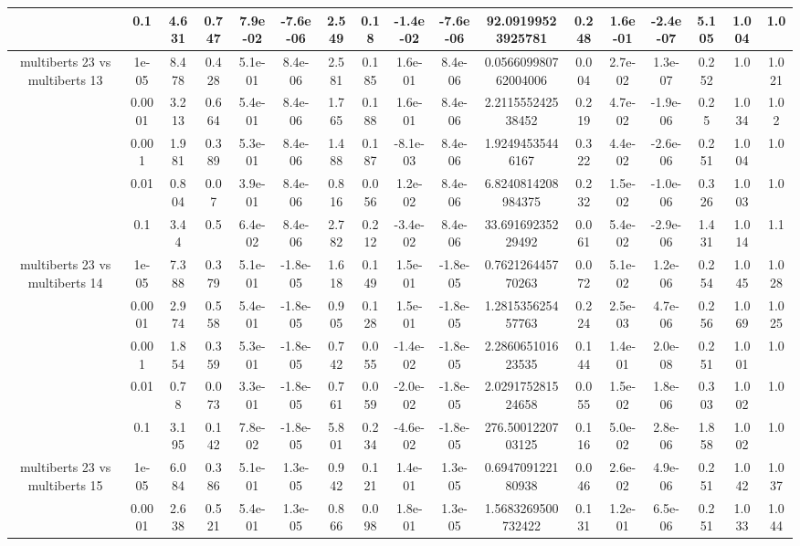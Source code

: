 \begin{tabular}{|c|c|c|c|c|c|c|c|c|c|c|c|c|c|c|c|c|}
 & 0.1 & 4.631 & 0.747 & 7.9e-02 & -7.6e-06 & 2.549 & 0.18 & -1.4e-02 & -7.6e-06 & 92.09199523925781 & 0.248 & 1.6e-01 & -2.4e-07 & 5.105 & 1.004 & 1.0 \\
\hline
\multirow{5}{*}{multiberts 23 vs multiberts 13} & 1e-05 & 8.478 & 0.428 & 5.1e-01 & 8.4e-06 & 2.581 & 0.185 & 1.6e-01 & 8.4e-06 & 0.056609980762004006 & 0.004 & 2.7e-02 & 1.3e-07 & 0.252 & 1.0 & 1.021 \\
 & 0.0001 & 3.213 & 0.664 & 5.4e-01 & 8.4e-06 & 1.765 & 0.188 & 1.6e-01 & 8.4e-06 & 2.211555242538452 & 0.219 & 4.7e-02 & -1.9e-06 & 0.25 & 1.034 & 1.02 \\
 & 0.001 & 1.981 & 0.389 & 5.3e-01 & 8.4e-06 & 1.488 & 0.187 & -8.1e-03 & 8.4e-06 & 1.92494535446167 & 0.322 & 4.4e-02 & -2.6e-06 & 0.251 & 1.004 & 1.0 \\
 & 0.01 & 0.804 & 0.07 & 3.9e-01 & 8.4e-06 & 0.816 & 0.056 & 1.2e-02 & 8.4e-06 & 6.8240814208984375 & 0.232 & 1.5e-02 & -1.0e-06 & 0.326 & 1.003 & 1.0 \\
 & 0.1 & 3.44 & 0.5 & 6.4e-02 & 8.4e-06 & 2.782 & 0.212 & -3.4e-02 & 8.4e-06 & 33.69169235229492 & 0.061 & 5.4e-02 & -2.9e-06 & 1.431 & 1.014 & 1.1 \\
\hline
\multirow{5}{*}{multiberts 23 vs multiberts 14} & 1e-05 & 7.388 & 0.379 & 5.1e-01 & -1.8e-05 & 1.618 & 0.149 & 1.5e-01 & -1.8e-05 & 0.762126445770263 & 0.072 & 5.1e-02 & 1.2e-06 & 0.254 & 1.045 & 1.028 \\
 & 0.0001 & 2.974 & 0.558 & 5.4e-01 & -1.8e-05 & 0.905 & 0.128 & 1.5e-01 & -1.8e-05 & 1.281535625457763 & 0.224 & 2.5e-03 & 4.7e-06 & 0.256 & 1.069 & 1.025 \\
 & 0.001 & 1.854 & 0.359 & 5.3e-01 & -1.8e-05 & 0.742 & 0.055 & -1.4e-02 & -1.8e-05 & 2.286065101623535 & 0.144 & 1.4e-01 & 2.0e-08 & 0.251 & 1.001 & 1.0 \\
 & 0.01 & 0.78 & 0.073 & 3.3e-01 & -1.8e-05 & 0.761 & 0.059 & -2.0e-02 & -1.8e-05 & 2.029175281524658 & 0.055 & 1.5e-02 & 1.8e-06 & 0.303 & 1.002 & 1.0 \\
 & 0.1 & 3.195 & 0.142 & 7.8e-02 & -1.8e-05 & 5.801 & 0.234 & -4.6e-02 & -1.8e-05 & 276.5001220703125 & 0.116 & 5.0e-02 & 2.8e-06 & 1.858 & 1.002 & 1.0 \\
\hline
\multirow{5}{*}{multiberts 23 vs multiberts 15} & 1e-05 & 6.084 & 0.386 & 5.1e-01 & 1.3e-05 & 0.942 & 0.121 & 1.4e-01 & 1.3e-05 & 0.694709122180938 & 0.046 & 2.6e-02 & 4.9e-06 & 0.251 & 1.042 & 1.037 \\
 & 0.0001 & 2.638 & 0.521 & 5.4e-01 & 1.3e-05 & 0.866 & 0.098 & 1.8e-01 & 1.3e-05 & 1.5683269500732422 & 0.131 & 1.2e-01 & 6.5e-06 & 0.251 & 1.033 & 1.044 \\

\end{tabular}
